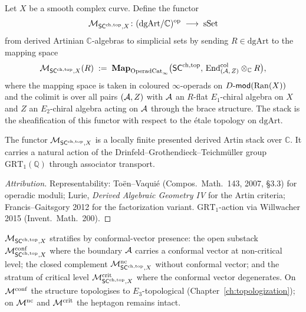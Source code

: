 \begin{definition}\label{def:moduli-sc-ch-top}%
%
\index{$\cM_{\SCchtop}$}
Let $X$ be a smooth complex curve. Define the functor
\begin{equation}
 \mathcal{M}_{\mathsf{SC}^{\mathrm{ch},\mathrm{top}},X}\colon
 (\mathrm{dgArt}/\mathbb{C})^{\mathrm{op}}
 \;\longrightarrow\;
 \mathrm{sSet}
\end{equation}
from derived Artinian $\mathbb{C}$-algebras to simplicial sets by
sending $R\in\mathrm{dgArt}$ to the mapping space
\begin{equation}
 \mathcal{M}_{\mathsf{SC}^{\mathrm{ch},\mathrm{top}},X}(R)
 \;:=\;
 \mathbf{Map}_{\mathrm{OperadCat}_\infty}
 \bigl(\mathsf{SC}^{\mathrm{ch},\mathrm{top}},\,
 \mathrm{End}^{\mathrm{col}}_{(\mathcal{A},\,Z)}\otimes_{\mathbb{C}} R\bigr),
\end{equation}
where the mapping space is taken in coloured $\infty$-operads on
$D\text{-}\mathsf{mod}(\mathrm{Ran}(X))$ and the colimit is over all pairs
$(\mathcal{A},Z)$ with $\mathcal{A}$ an $R$-flat $E_1$-chiral algebra on $X$ and
$Z$ an $E_2$-chiral algebra acting on $\mathcal{A}$ through the brace
structure. The stack is the sheafification of this functor with respect
to the étale topology on $\mathrm{dgArt}$.
\end{definition}

\begin{lemma}
\label{lem:moduli-sc-representable}
The functor $\mathcal{M}_{\mathsf{SC}^{\mathrm{ch},\mathrm{top}},X}$ is a locally finite presented derived
Artin stack over $\mathbb{C}$. It carries a natural action of the
Drinfeld--Grothendieck--Teichm\"uller group
$\mathrm{GRT}_1(\mathbb{Q})$ through associator transport.
\end{lemma}

\begin{proof}[Attribution]
Representability: To\"en--Vaqui\'e (Compos.\ Math.\ 143, 2007,
\S3.3) for operadic moduli; Lurie, \emph{Derived Algebraic Geometry IV}
for the Artin criteria; Francis--Gaitsgory 2012 for the
factorization variant. $\mathrm{GRT}_1$-action via Willwacher 2015
(Invent.\ Math.\ 200).
\end{proof}

\begin{remark}\label{rem:moduli-strata}
$\mathcal{M}_{\mathsf{SC}^{\mathrm{ch},\mathrm{top}},X}$ stratifies by conformal-vector presence:
the open substack $\mathcal{M}^{\mathrm{conf}}_{\mathsf{SC}^{\mathrm{ch},\mathrm{top}},X}$ where the
boundary $\mathcal{A}$ carries a conformal vector at non-critical level;
the closed complement $\mathcal{M}^{\mathrm{nc}}_{\mathsf{SC}^{\mathrm{ch},\mathrm{top}},X}$ without
conformal vector; and the stratum of critical level
$\mathcal{M}^{\mathrm{crit}}_{\mathsf{SC}^{\mathrm{ch},\mathrm{top}},X}$ where the conformal vector
degenerates. On $\mathcal{M}^{\mathrm{conf}}$ the structure topologises to
$E_3$-topological (Chapter~\ref{ch:topologization}); on
$\mathcal{M}^{\mathrm{nc}}$ and $\mathcal{M}^{\mathrm{crit}}$ the heptagon remains
intact.
\end{remark}


